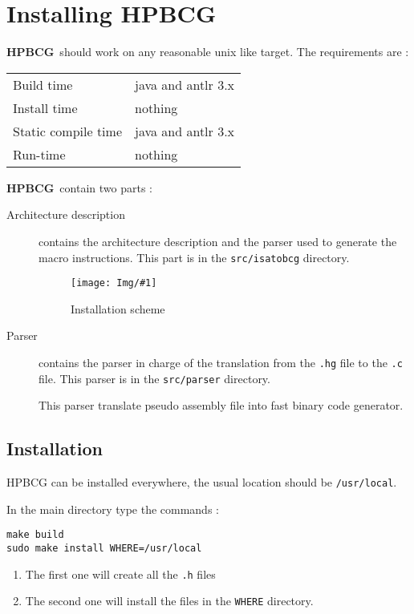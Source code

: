 \documentclass{article}
\newcommand{\hpbcg}{\textbf{HPBCG}\ }
\newcommand{\Fig}[2]{\texttt{[image: Img/\#1]}}
\begin{document}
\section{Installing \hpbcg}

\hpbcg should work on any reasonable unix like target. The
requirements are :

\begin{tabular}{|l | l |}\hline
Build time          & java and antlr 3.x 	\\
Install time        & nothing 			\\
Static compile time & java and antlr 3.x 	\\
Run-time            & nothing 			\\ \hline
\end{tabular}

\hpbcg contain two parts :
\begin{description}
\item[Architecture description] contains the architecture description
  and the parser used to generate the macro instructions. This part is
  in the \texttt{src/isatobcg} directory.
  \begin{figure}
    \centering
    \Fig{IsaToHPBCGChain.pdf}{6}
    \caption{Installation scheme}
    \label{fig:Install}
  \end{figure}
\item[Parser] contains the parser in charge of the translation from
  the \texttt{.hg} file to the \texttt{.c} file. This parser is in the
  \texttt{src/parser} directory.

  This parser translate pseudo assembly file into fast binary code
  generator.
\end{description}

\subsection{Installation}

HPBCG can be installed everywhere, the usual location should be
\texttt{/usr/local}.

In the main directory type the commands :
\begin{verbatim}
make build
sudo make install WHERE=/usr/local
\end{verbatim}

\begin{enumerate}
\item The first one will create all the \texttt{.h} files
\item The second one will install the files in the \texttt{WHERE} directory.
\end{enumerate}
\end{document}
